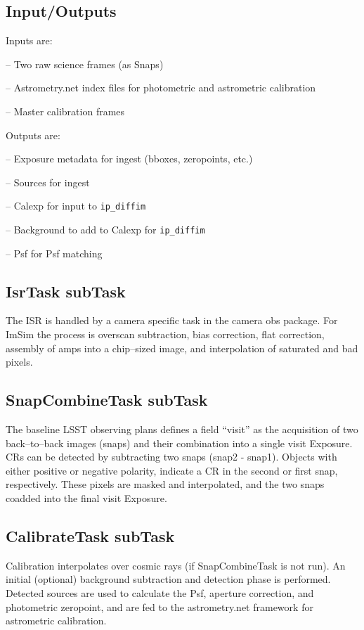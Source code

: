 \documentclass[prd, nofootinbib, floatfix, 11pt,tightenlines,times]{article}
\begin{document}
\subsection{Input/Outputs}
Inputs are:

-- Two raw science frames (as Snaps)

-- Astrometry.net index files for photometric and astrometric calibration

-- Master calibration frames


Outputs are:

-- Exposure metadata for ingest (bboxes, zeropoints, etc.)

-- Sources for ingest

-- Calexp for input to {\tt ip\_diffim}

-- Background to add to Calexp for {\tt ip\_diffim}

-- Psf for Psf matching

\subsection{IsrTask subTask}
The ISR is handled by a camera specific task in the camera obs
package.  For ImSim the process is overscan subtraction, bias
correction, flat correction, assembly of amps into a chip--sized
image, and interpolation of saturated and bad pixels.

\subsection{SnapCombineTask subTask}
The baseline LSST observing plans defines a field ``visit'' as the
acquisition of two back--to--back images (snaps) and their combination
into a single visit Exposure.  CRs can be detected by subtracting two
snaps (snap2 - snap1). Objects with either positive or negative
polarity, indicate a CR in the second or first snap, respectively.
These pixels are masked and interpolated, and the two snaps coadded
into the final visit Exposure.


\subsection{CalibrateTask subTask} 
Calibration interpolates over cosmic rays (if
SnapCombineTask is not run).  An initial (optional)
background subtraction and detection phase is performed.  Detected
sources are used to calculate the Psf, aperture correction, and
photometric zeropoint, and are fed to the astrometry.net framework for
astrometric calibration.
\end{document}
